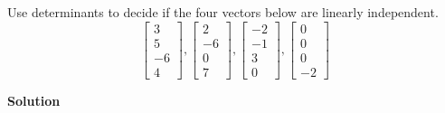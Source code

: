 \documentclass[11pt]{scrartcl}
\theoremstyle{dotlessP}
\theoremstyle{dotlessN}
\begin{document}
\begin{ques}
	Use determinants to decide if the four vectors below are linearly independent.
	\[
	\begin{bmatrix}
		3 \\
		5 \\
		-6 \\
		4
	\end{bmatrix},
	\begin{bmatrix}
		2 \\
		-6 \\
		0 \\
		7
	\end{bmatrix},
	\begin{bmatrix}
		-2 \\
		-1 \\
		3 \\
		0
	\end{bmatrix}, 
	\begin{bmatrix}
		 0 \\
		 0 \\
		 0 \\
		 -2
	\end{bmatrix}
	\] 
\end{ques}
\textbf{Solution}
\end{document}
